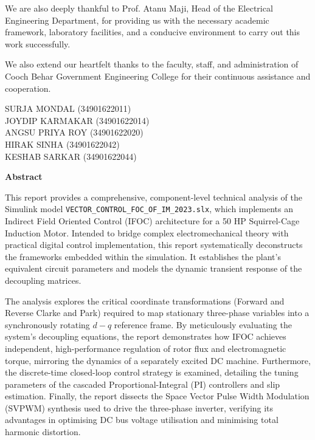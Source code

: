 \documentclass[12pt,a4paper]{report}
\begin{document}
We are also deeply thankful to Prof. Atanu Maji, Head of the Electrical Engineering Department, for providing us with the necessary academic framework, laboratory facilities, and a conducive environment to carry out this work successfully. 

We also extend our heartfelt thanks to the faculty, staff, and administration of Cooch Behar Government Engineering College for their continuous assistance and cooperation.

\vspace{2cm}
\begin{flushright}
SURJA MONDAL (34901622011)\\
JOYDIP KARMAKAR (34901622014)\\
ANGSU PRIYA ROY (34901622020)\\
HIRAK SINHA (34901622042)\\
KESHAB SARKAR (34901622044)
\end{flushright}

\newpage
\tableofcontents
\newpage
\listoffigures
\newpage
\listoftables

\newpage
\begin{center}
{\Large \bfseries Abstract\par}
\end{center}
\vspace{1cm}
This report provides a comprehensive, component-level technical analysis of the Simulink model \texttt{VECTOR\_CONTROL\_FOC\_OF\_IM\_2023.slx}, which implements an Indirect Field Oriented Control (IFOC) architecture for a 50 HP Squirrel-Cage Induction Motor. Intended to bridge complex electromechanical theory with practical digital control implementation, this report systematically deconstructs the frameworks embedded within the simulation. It establishes the plant's equivalent circuit parameters and models the dynamic transient response of the decoupling matrices. 

The analysis explores the critical coordinate transformations (Forward and Reverse Clarke and Park) required to map stationary three-phase variables into a synchronously rotating $d-q$ reference frame. By meticulously evaluating the system's decoupling equations, the report demonstrates how IFOC achieves independent, high-performance regulation of rotor flux and electromagnetic torque, mirroring the dynamics of a separately excited DC machine. Furthermore, the discrete-time closed-loop control strategy is examined, detailing the tuning parameters of the cascaded Proportional-Integral (PI) controllers and slip estimation. Finally, the report dissects the Space Vector Pulse Width Modulation (SVPWM) synthesis used to drive the three-phase inverter, verifying its advantages in optimising DC bus voltage utilisation and minimising total harmonic distortion.
\end{document}
